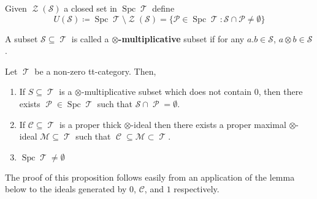 \documentclass[11pt]{article}
\DeclareMathOperator{\CC}{\mathcal{C}}
\DeclareMathOperator{\cZ}{\mathcal{Z}}
\DeclareMathOperator{\TT}{\mathcal{T}}
\DeclareMathOperator{\cP}{\mathcal{P}}
\DeclareMathOperator{\spc}{Spc}
\begin{document}
\begin{defn}
Given $\cZ(\mathcal{S})$ a closed set in $\spc \TT$ define 
\[
	U(\mathcal{S})\coloneqq \spc \TT \setminus \cZ(\mathcal{S}) = \{\mathcal{P} \in \spc \TT: \mathcal{S} \cap \mathcal{P} \not = \emptyset\}
\] 
\end{defn}

\begin{defn}
A subset $\mathcal{S} \subseteq \TT$ is called a \textbf{$\otimes$-multiplicative} subset if for any $a.b \in \mathcal{S}$, $a \otimes b \in \mathcal{S}$.
\end{defn}


\begin{prop}\label{multsubprops}
Let $\TT$ be a non-zero tt-category. Then, 
\begin{enumerate}[1.]
\item If $S \subseteq \TT$ is a $\otimes$-multiplicative subset which does not contain $0$, then there exists $\cP \in \spc \TT$ such that $\mathcal{S} \cap \cP = \emptyset$.
\item If $\mathcal{C} \subseteq \TT$ is a proper thick $\otimes$-ideal then there exists a proper maximal $\otimes$-ideal $\mathcal{M} \subseteq \TT$ such that $\CC \subseteq \mathcal{M} \subset \TT$.
	\item $\spc \TT \not = \emptyset$
\end{enumerate}
\end{prop}

The proof of this proposition follows easily from an application of the lemma below to the ideals generated by $0$, $\mathcal{C}$, and $1$ respectively.
\end{document}
